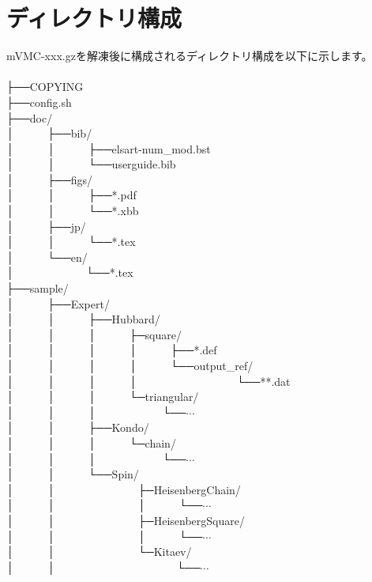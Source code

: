 \label{Sec:HowToInstall}

\section{ディレクトリ構成}
mVMC-xxx.gzを解凍後に構成されるディレクトリ構成を以下に示します。\\
\\
├──COPYING\\
├──config.sh\\
├──doc/\\
│~~~~~~├──bib/\\
│~~~~~~│~~~~~~├──elsart-num\_mod.bst\\
│~~~~~~│~~~~~~└──userguide.bib\\
│~~~~~~├──figs/\\
│~~~~~~│~~~~~~├──*.pdf\\
│~~~~~~│~~~~~~└──*.xbb\\
│~~~~~~├──jp/\\
│~~~~~~│~~~~~~└──*.tex\\
│~~~~~~└──en/\\
│~~~~~~~~~~~~~└──*.tex\\
├──sample/\\
│~~~~~~├──Expert/\\
│~~~~~~│~~~~~~├──Hubbard/\\
│~~~~~~│~~~~~~│~~~~~~├─square/\\
│~~~~~~│~~~~~~│~~~~~~│~~~~~~├──*.def\\
│~~~~~~│~~~~~~│~~~~~~│~~~~~~└──output\_ref/\\
│~~~~~~│~~~~~~│~~~~~~│~~~~~~~~~~~~~~~~~~└──**.dat\\
│~~~~~~│~~~~~~│~~~~~~└─triangular/\\
│~~~~~~│~~~~~~│~~~~~~~~~~~~└──$\cdots$\\
│~~~~~~│~~~~~~├──Kondo/\\
│~~~~~~│~~~~~~│~~~~~~└─chain/\\
│~~~~~~│~~~~~~│~~~~~~~~~~~~└──$\cdots$\\
│~~~~~~│~~~~~~└──Spin/\\
│~~~~~~│~~~~~~~~~~~~~~~├─HeisenbergChain/\\
│~~~~~~│~~~~~~~~~~~~~~~│~~~~~~└──$\cdots$\\
│~~~~~~│~~~~~~~~~~~~~~~├─HeisenbergSquare/\\
│~~~~~~│~~~~~~~~~~~~~~~│~~~~~~└──$\cdots$\\
│~~~~~~│~~~~~~~~~~~~~~~└─Kitaev/\\
│~~~~~~│~~~~~~~~~~~~~~~~~~~~~~└──$\cdots$\\
